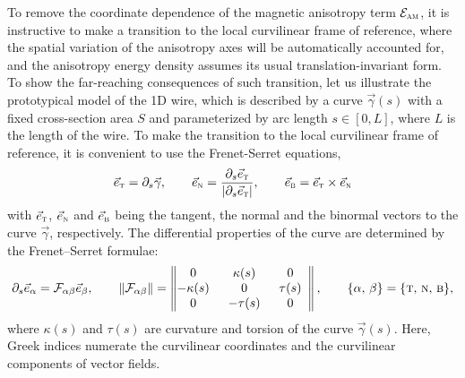 \documentclass[showpacs,amsmath,amssymb,aps,pra,longbibliography,
10pt,preprint,superscriptaddress,showkeys]{revtex4-1}
\begin{document}
To remove the coordinate dependence of the magnetic anisotropy term $\mathcal{E}_\textsc{am}$, it is instructive to make a transition to the local curvilinear frame of reference, where the spatial variation of the anisotropy axes will be automatically accounted for, and the anisotropy energy density assumes its usual translation-invariant form. To show the far-reaching consequences of such transition, let us illustrate the prototypical model of the 1D wire, which is described by a curve $\vec{\gamma}(s)$ with a fixed cross-section area $S$ and parameterized by arc length $s\in\left[0,L\right]$, where $L$ is the length of the wire. To make the transition to the local curvilinear frame of reference, it is convenient to use the Frenet-Serret equations,  
\begin{equation}\label{eq:FrenetSerret_basis}
\vec{e}_\textsc{t}=\partial_s \vec{\gamma},\qquad \vec{e}_\textsc{n}=\frac{\partial_s\vec{e}_\textsc{t}}{|\partial_s\vec{e}_\textsc{t}|},\qquad \vec{e}_\textsc{b}=\vec{e}_\textsc{t}\times\vec{e}_\textsc{n}
\end{equation}
with $\vec{e}_\textsc{t}$, $\vec{e}_\textsc{n}$ and $\vec{e}_\textsc{b}$ being the tangent, the normal and the binormal vectors to the curve $\vec{\gamma}$, respectively. The differential properties of the curve are determined by the Frenet--Serret formulae:
\begin{equation}\notag%
\partial_s\vec{e}_\alpha = \mathcal{F}_{\alpha\beta}\vec{e}_\beta, \qquad
 \|\mathcal{F}_{\alpha\beta}\|=
\begin{Vmatrix*}  0 \, \, \,	& \kappa(s) & \, \, \, 0 \, \, \, \\ -\kappa(s) \, \, \, & 0  & \, \, \, \tau(s) \, \, \, \\  0 \, \, \, & -\tau(s) & \, \, \, 0 \, \, \,
\end{Vmatrix*}, \qquad \{\alpha,\, \beta\} = \{\textsc{t},\, \textsc{n},\, \textsc{b}\},
\end{equation}
where $\kappa(s)$ and $\tau(s)$ are curvature and torsion of the curve $\vec{\gamma}(s)$. Here, Greek indices numerate the curvilinear coordinates and the curvilinear components of vector fields. 
\end{document}
